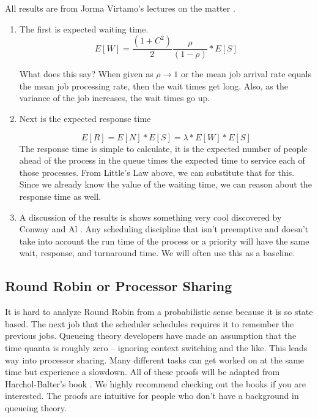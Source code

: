 All results are from Jorma Virtamo's lectures on the matter \cite{virtamo}.

\begin{enumerate}
\item The first is expected waiting time.
  \[
  E[W] = \frac{(1 + C^2)}{2}\frac{\rho}{(1 - \rho)} * E[S]
  \]

  What does this say? When given as $\rho \rightarrow 1$ or the mean job arrival rate equals the mean job processing rate, then the wait times get long.
  Also, as the variance of the job increases, the wait times go up.

\item Next is the expected response time

  \[
  E[R] = E[N] * E[S] = \lambda * E[W] * E[S]
  \]
  The response time is simple to calculate, it is the expected number of people ahead of the process in the queue times the expected time to service each of those processes.
  From Little's Law above, we can substitute that for this. Since we already know the value of the waiting time, we can reason about the response time as well.
\item A discussion of the results is shows something very cool discovered by Conway and Al \cite{conway1967theory}.
  Any scheduling discipline that isn't preemptive and doesn't take into account the run time of the process or a priority will have the same wait, response, and turnaround time.
  We will often use this as a baseline.
\end{enumerate}

\subsection{Round Robin or Processor Sharing}

It is hard to analyze Round Robin from a probabilistic sense because it is so state based.
The next job that the scheduler schedules requires it to remember the previous jobs.
Queueing theory developers have made an assumption that the time quanta is roughly zero -- ignoring context switching and the like.
This leads way into processor sharing.
Many different tasks can get worked on at the same time but experience a slowdown.
All of these proofs will be adapted from Harchol-Balter's book \cite{harchol2013performance}.
We highly recommend checking out the books if you are interested.
The proofs are intuitive for people who don't have a background in queueing theory.

